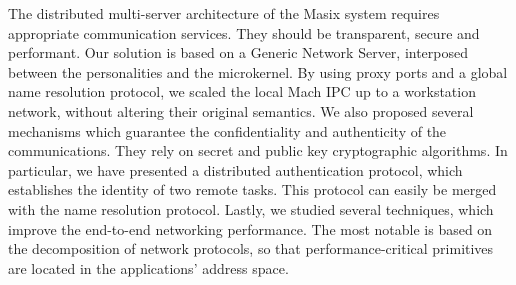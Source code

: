 The distributed multi-server architecture of the Masix system requires 
appropriate communication services. They should be transparent, secure and 
performant.
Our solution is based on a Generic Network Server, interposed between the 
personalities and the microkernel. By using proxy ports and a global name 
resolution protocol, we scaled the local Mach IPC up to a workstation network,
 without altering their original semantics.
We also proposed several mechanisms which guarantee the confidentiality and
authenticity of the communications. They rely on secret and public key cryptographic algorithms. In particular, we have presented a distributed 
authentication protocol, which establishes the identity of two remote tasks. 
This protocol can easily be merged with the name resolution protocol.
Lastly, we studied several techniques, which improve the end-to-end 
networking performance. The most notable is based on the decomposition of
 network protocols, so that performance-critical primitives are located in
the applications' address space.






